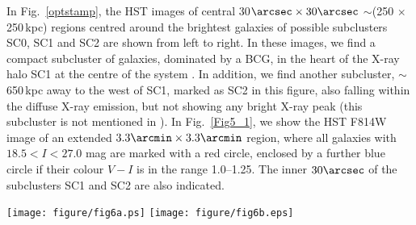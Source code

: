 \documentclass[useASM,usenatbib]{mn2e}
\newcommand{\mac}{\rm~MACS J0553.4-3342}
\begin{document}
In Fig.~\ref{optstamp}, the HST images of
  central 30$\arcsec \times 30\arcsec$ $\sim$(250 $\times$ 250\,kpc)
  regions centred  around the brightest galaxies of  possible subclusters 
  SC0, SC1 and SC2 are shown from left to right.
In these images, we find a compact subcluster of galaxies, dominated by
a BCG, in the heart of the X-ray halo SC1 at the centre of the system
\citep{2012MNRAS.426...40B}. In addition, 
we find another subcluster,
$\sim$ 650\,kpc away to the west of SC1, marked as SC2 in this
figure, also  falling within the diffuse X-ray emission, but not showing  any bright X-ray peak
(this subcluster  is not  mentioned  in \cite{2012MNRAS.426...40B}).
In Fig.~\ref{Fig5_1}, we show the HST F814W image of an extended
$3.3\arcmin \times 3.3\arcmin$ region, where all galaxies with
$18.5<I<27.0$ mag are marked with a red circle, enclosed by a
further blue circle if their colour $V-I$ is in the range 1.0--1.25. The inner $30\arcsec$ of the subclusters SC1 and SC2 are also indicated.





\begin{figure*}
\texttt{[image: figure/fig6a.ps]}
\texttt{[image: figure/fig6b.eps]}
\caption{{\it left panel:}  The 0.7$-$4.0 keV {\it  Chandra} image used
  for  the  extraction  of  the  surface  brightness  profile  of  the
  distribution of  the ICM within  \mac. The highlighted  wedge shaped
  arcs  are for  extracting  profiles for  the  identification of  the
  discontinuities in  the surface brightness distribution.  {\it right
    panel:} Projected  radial surface  brightness distribution  in the
  energy range  0.7$-$4.0\,keV of  \mac.  The  continuous line  in this
  figure indicates the best-fit 1D $\beta$-model to the data points
  (black crosses).}
\label{fig3_1}
\end{figure*}
\end{document}
